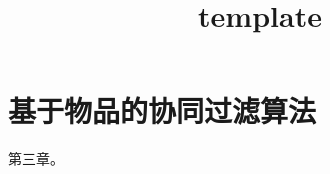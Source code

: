 \documentclass{../upctrans}
\title{template}
\begin{document}
\section{基于物品的协同过滤算法}

第三章。
\end{document}
